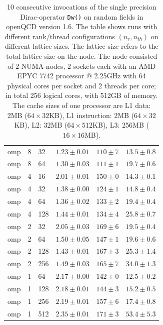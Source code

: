 \documentclass{article}
\theoremstyle{plain} %
\theoremstyle{convention} %
\theoremstyle{remark} %
\def\code#1{\texttt{#1}}
\numberwithin{equation}{section}
\begin{document}
\begin{table}
\begin{tabular}{ |p{1.5cm}||p{1cm}|p{1cm}|p{2cm}|p{2cm}|p{2cm}| }
        omp & 8 & 32 & $1.23 \pm 0.01$ & $110 \pm 7$ & $13.5 \pm 0.8$ \\
        omp & 8 & 64 & $1.30 \pm 0.03$ & $111 \pm 1$ & $19.7 \pm 0.6$ \\
        \hline
        omp & 4 & 16 & $2.01 \pm 0.01$ & $150 \pm 0$ & $14.3 \pm 0.1$ \\
        omp & 4 & 32 & $1.38 \pm 0.00$ & $124 \pm 1$ & $14.8 \pm 0.4$ \\
        omp & 4 & 64 & $1.36 \pm 0.02$ & $133 \pm 2$ & $19.4 \pm 0.4$ \\
        omp & 4 & 128 & $1.44 \pm 0.01$ & $134 \pm 4$ & $25.8 \pm 0.7$ \\
        \hline
        omp & 2 & 32 & $2.05 \pm 0.03$ & $169 \pm 6$ & $19.5 \pm 0.4$ \\
        omp & 2 & 64 & $1.50 \pm 0.05$ & $147 \pm 1$ & $19.6 \pm 0.6$ \\
        omp & 2 & 128 & $1.43 \pm 0.01$ & $167 \pm 3$ & $25.3 \pm 1.4$ \\
        omp & 2 & 256 & $1.49 \pm 0.03$ & $165 \pm 7$ & $34.0 \pm 1.3$ \\
        \hline
        omp & 1 & 64 & $2.17 \pm 0.00$ & $142 \pm 0$ & $12.5 \pm 0.2$ \\
        omp & 1 & 128 & $2.18 \pm 0.01$ & $144 \pm 3$ & $15.2 \pm 0.5$ \\
        omp & 1 & 256 & $2.19 \pm 0.01$ & $157 \pm 6$ & $17.4 \pm 0.8$ \\
        omp & 1 & 512 & $2.35 \pm 0.01$ & $171 \pm 3$ & $53.4 \pm 5.3$ \\
        \hline
    \end{tabular}
    \caption{\num{10} consecutive invocations of the single precision Dirac-operator \code{Dw()} on random fields in openQCD version 1.6. The table shows runs with different rank/thread configurations $(n_r, n_{th})$ on different lattice sizes. The lattice size refers to the total lattice size on the node. The node consisted of \num{2} NUMA-nodes, \num{2} sockets each with an AMD EPYC 7742 processor @ 2.25GHz with \num{64} physical cores per socket and \num{2} threads per core; in total \num{256} logical cores, with 512GB of memory. The cache sizes of one processor are L1 data: 2MB ($64 \times 32$KB), L1 instruction: 2MB ($64 \times 32$KB), L2: 32MB ($64 \times 512$KB), L3: 256MB ($16 \times 16$MB).}
    \label{tab:dop_omp_amd}
\end{table}
\end{document}
